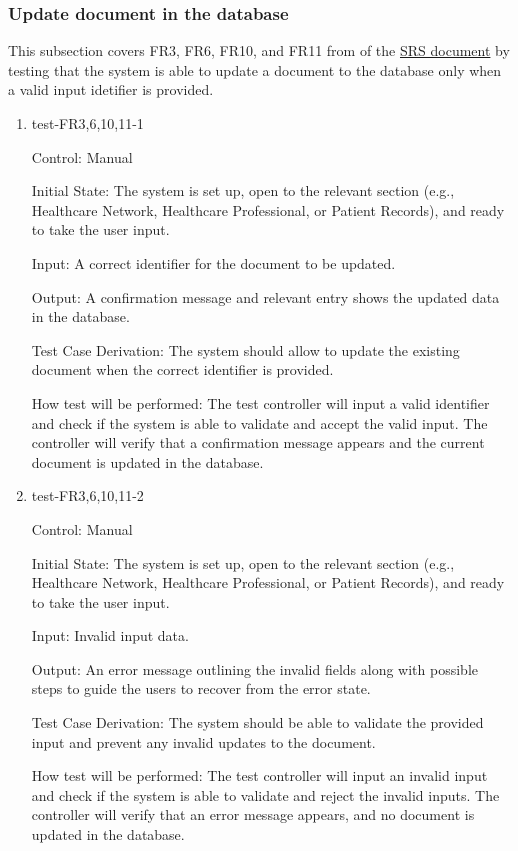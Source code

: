 \documentclass[12pt, titlepage]{article}
\begin{document}
\subsubsection{Update document in the database} \label{section:4.1.3}

This subsection covers FR3, FR6, FR10, and FR11 from of the \href{https://github.com/Inreet-Kaur/capstone/blob/main/docs/SRS/SRS.pdf}{SRS document} by testing that the system is able to update a document to the database only when a valid input idetifier is provided.

\begin{enumerate}

\item{test-FR3,6,10,11-1} \label{test-FR3,6,10,11-1}

Control: Manual

Initial State: The system is set up, open to the relevant section (e.g., Healthcare Network, Healthcare Professional, or Patient Records), and ready to take the user input.

Input: A correct identifier for the document to be updated.

Output: A confirmation message and relevant entry shows the updated data in the database.

Test Case Derivation: The system should allow to update the existing document when the correct identifier is provided.

How test will be performed: The test controller will input a valid identifier and check if the system is able to validate and accept the valid input. The controller will verify that a confirmation message appears and the current document is updated in the database.


\item{test-FR3,6,10,11-2} \label{test-FR3,6,10,11-2}

Control: Manual

Initial State: The system is set up, open to the relevant section (e.g., Healthcare Network, Healthcare Professional, or Patient Records), and ready to take the user input.

Input: Invalid input data.

Output: An error message outlining the invalid fields along with possible steps to guide the users to recover from the error state.

Test Case Derivation: The system should be able to validate the provided input and prevent any invalid updates to the document.

How test will be performed: The test controller will input an invalid input and check if the system is able to validate and reject the invalid inputs. The controller will verify that an error message appears, and no document is updated in the database. 

\end{enumerate}
\end{document}
